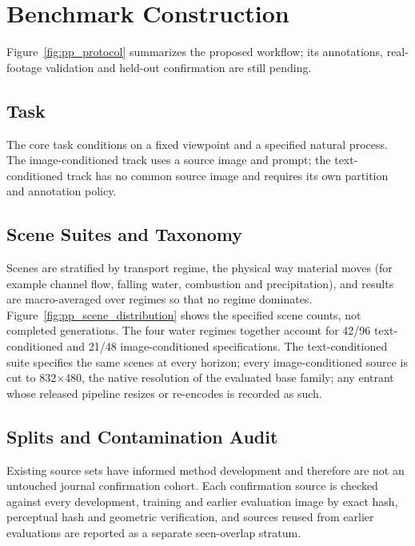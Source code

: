 \section{Benchmark Construction}
\label{sec:benchmark}
Figure~\ref{fig:pp_protocol} summarizes the proposed workflow; its annotations,
real-footage validation and held-out confirmation are still pending.
\subsection{Task}
The core task conditions on a fixed viewpoint and a specified natural process. The image-conditioned track uses a source image and prompt; the text-conditioned track has no common source image and requires its own partition and annotation policy.

\subsection{Scene Suites and Taxonomy}
Scenes are stratified by transport regime, the physical way material moves (for example channel flow, falling water, combustion and precipitation), and results are macro-averaged over regimes so that no regime dominates. Figure~\ref{fig:pp_scene_distribution} shows the specified scene counts, not completed generations. The four water regimes together account for 42/96 text-conditioned and 21/48 image-conditioned specifications. The text-conditioned suite specifies the same scenes at every horizon; every image-conditioned source is cut to 832$\times$480, the native resolution of the evaluated base family; any entrant whose released pipeline resizes or re-encodes is recorded as such. 


\subsection{Splits and Contamination Audit}
Existing source sets have informed method development and therefore are not an untouched journal confirmation cohort. Each confirmation source is checked against every development, training and earlier evaluation image by exact hash, perceptual hash and geometric verification, and sources reused from earlier evaluations are reported as a separate seen-overlap stratum. 

